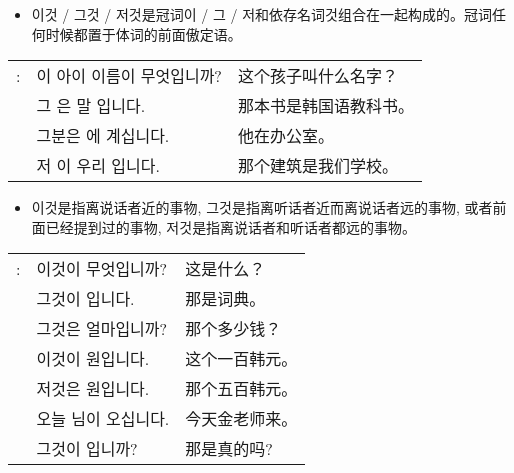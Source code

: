 \begin{grammar}
	\begin{grammarsect}[\kr 이것 / 그것 / 저것]
		\begin{itemize}
			\item {\kr 이것 / 그것 / 저것}是冠词{\kr 이 / 그 / 저}和依存名词{\kr 것}组合在一起构成的。冠词任何时候都置于体词的前面傲定语。
		\end{itemize}
		\begin{tabular}{lll}
			\kr \ruby{例}{예}: & \kr 이 아이 이름이 무엇입니까?                                   & 这个孩子叫什么名字？  \\
			                 & \kr 그 \ruby{冊}{책}은 \ruby{韓國}{한국}말 \ruby{敎科書}{교과서}입니다. & 那本书是韩国语教科书。 \\
			                 & \kr 그분은 \ruby{事務室}{사무실}에 계십니다.                        & 他在办公室。      \\
			                 & \kr 저 \ruby{建物}{건물}이 우리 \ruby{學校}{학교}입니다.             & 那个建筑是我们学校。  \\
		\end{tabular}
		\begin{itemize}
			\item {\kr 이것}是指离说话者近的事物, {\kr 그것}是指离听话者近而离说话者远的事物, 或者前面已经提到过的事物, {\kr 저것}是指离说话者和听话者都远的事物。
		\end{itemize}
		\begin{tabular}{lll}
			\kr \ruby{例}{예}: & \kr 이것이 무엇입니까?                           & 这是什么？   \\
			                 & \kr 그것이 \ruby{辭典}{사전}입니다.                & 那是词典。   \\
			                 & \kr 그것은 얼마입니까?                           & 那个多少钱？  \\
			                 & \kr 이것이 \ruby{百}{백} 원입니다.                & 这个一百韩元。 \\
			                 & \kr 저것은 \ruby{五百}{오백} 원입니다.              & 那个五百韩元。 \\
			                 & \kr 오늘 \ruby{金}{김} \ruby{先生}{선생}님이 오십니다. & 今天金老师来。 \\
			                 & \kr 그것이 \ruby{事實}{사실}입니까?                & 那是真的吗?
		\end{tabular}\\
	\end{grammarsect}
\end{grammar}
